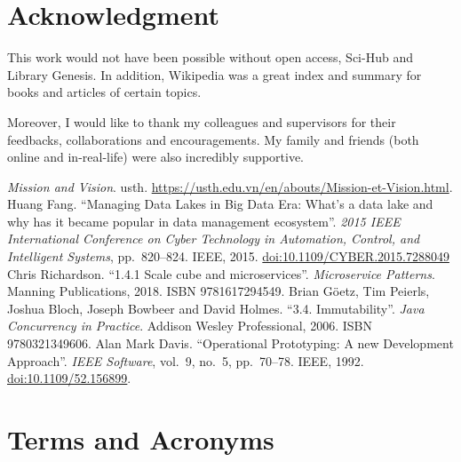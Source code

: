 \documentclass[a4paper,oneside,12pt]{book}
\newcommand{\doi}[1]{\href{https://doi.org/#1}{doi:#1}}
\begin{document}
\begin{appendices}
\chapter{Acknowledgment}
This work would not have been possible without open access,
Sci-Hub and Library Genesis.  In addition, Wikipedia was a great index
and summary for books and articles of certain topics.

Moreover, I would like to thank my colleagues and supervisors
for their feedbacks, collaborations and encouragements.  My family and friends
(both online and in-real-life) were also incredibly supportive.

\begin{thebibliography}{69}
   \emph{Mission and Vision}.  \acrlong{usth}.
    \url{https://usth.edu.vn/en/abouts/Mission-et-Vision.html}.
   Huang Fang.
    ``Managing Data Lakes in Big Data Era: What's a data lake
    and why has it became popular in data management ecosystem''.
    \emph{2015 IEEE International Conference on Cyber Technology
    in Automation, Control, and Intelligent Systems}, pp.~820--824.
    IEEE, 2015.  \doi{10.1109/CYBER.2015.7288049}
   Chris Richardson.
    ``1.4.1 Scale cube and microservices''.  \emph{Microservice Patterns}.
    Manning Publications, 2018.  ISBN 9781617294549.
   Brian Göetz, Tim Peierls, Joshua Bloch,
    Joseph Bowbeer and David Holmes.
    ``3.4. Immutability''.  \emph{Java Concurrency in Practice}.
    Addison Wesley Professional, 2006.  ISBN 9780321349606.
   Alan Mark Davis.
    ``Operational Prototyping: A new Development Approach''.
    \emph{IEEE Software}, vol.~9, no.~5, pp.~70--78.
    IEEE, 1992.  \doi{10.1109/52.156899}.
\end{thebibliography}

\chapter{Terms and Acronyms}
\printglossaries
\end{appendices}
\end{document}
